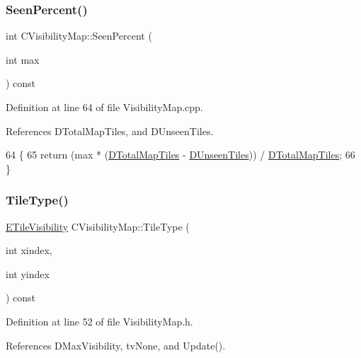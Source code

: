 \subsubsection{\texorpdfstring{Seen\+Percent()}{SeenPercent()}}
{\footnotesize\ttfamily int C\+Visibility\+Map\+::\+Seen\+Percent (\begin{DoxyParamCaption}\item[{int}]{max }\end{DoxyParamCaption}) const}



Definition at line 64 of file Visibility\+Map.\+cpp.



References D\+Total\+Map\+Tiles, and D\+Unseen\+Tiles.


\begin{DoxyCode}
64                                             \{
65     \textcolor{keywordflow}{return} (max * (\hyperlink{classCVisibilityMap_a9bd6e633268535677aeefbd886c29485}{DTotalMapTiles} - \hyperlink{classCVisibilityMap_a117ff39fef73ffd4cc4ba35c35e63171}{DUnseenTiles})) / 
      \hyperlink{classCVisibilityMap_a9bd6e633268535677aeefbd886c29485}{DTotalMapTiles};
66 \}
\end{DoxyCode}
\hypertarget{classCVisibilityMap_a8517fe52114dd469093fd1bd13482733}{}\label{classCVisibilityMap_a8517fe52114dd469093fd1bd13482733} 
\subsubsection{\texorpdfstring{Tile\+Type()}{TileType()}}
{\footnotesize\ttfamily \hyperlink{classCVisibilityMap_a6665f905da08825adbb0eee7bd1f2f30}{E\+Tile\+Visibility} C\+Visibility\+Map\+::\+Tile\+Type (\begin{DoxyParamCaption}\item[{int}]{xindex,  }\item[{int}]{yindex }\end{DoxyParamCaption}) const\hspace{0.3cm}{\ttfamily [inline]}}



Definition at line 52 of file Visibility\+Map.\+h.



References D\+Max\+Visibility, tv\+None, and Update().



